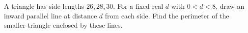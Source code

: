 A triangle has side lengths $26,28,30$. For a fixed real $d$ with $0<d<8$, draw an inward parallel line at distance $d$ from each side. Find the perimeter of the smaller triangle enclosed by these lines.
